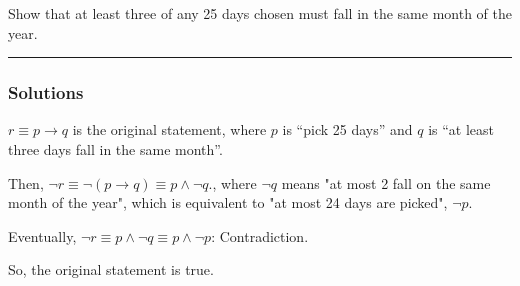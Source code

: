 \newpage
\begin{question}
Show that at least three of any 25 days chosen must fall
in the same month of the year.
\end{question}

\par\noindent\rule{\textwidth}{0.5pt}

\subsubsection*{Solutions}

$ r \equiv p \rightarrow q$ is the original statement, where $p$ is ``pick 25 days'' and $q$ is ``at least three days fall in the same month''.

\bigskip

\noindent Then, $\neg r \equiv \neg (p \rightarrow q) \equiv p \wedge \neg q$., where $\neg q$ means "at most 2 fall on the same month of the year", which is equivalent to "at most 24 days are picked", $\neg p$.

\bigskip

\noindent Eventually, $\neg r \equiv p \wedge \neg q \equiv p \wedge \neg p$: Contradiction.

\bigskip

\noindent So, the original statement is true.